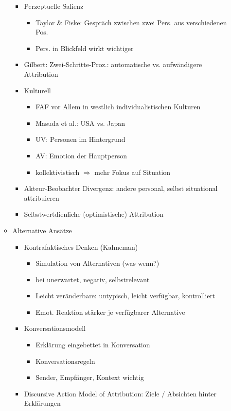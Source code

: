 \documentclass[11pt, paper=a4, twocolumn]{scrartcl}
\begin{document}
\begin{itemize}
\begin{itemize}
\begin{itemize}
\begin{itemize}
								\end{itemize}
							\item Perzeptuelle Salienz
								\begin{itemize}
									\item Taylor \& Fiske: Gespräch zwischen zwei Pers. aus verschiedenen Pos.
									\item Pers. in Blickfeld wirkt wichtiger
								\end{itemize}
							\item Gilbert: Zwei-Schritte-Proz.: automatische vs. aufwändigere Attribution
							\item Kulturell
								\begin{itemize}
									\item FAF vor Allem in westlich individualistischen Kulturen
									\item Masuda et al.: USA vs. Japan
									\item UV: Personen im Hintergrund
									\item AV: Emotion der Hauptperson
									\item kollektivistisch $\Rightarrow$ mehr Fokus auf Situation
								\end{itemize}
							\item Akteur-Beobachter Divergenz: andere personal, selbst situational attribuieren
							\item Selbstwertdienliche (optimistische) Attribution
						\end{itemize}
					\item Alternative Ansätze
						\begin{itemize}
							\item Kontrafaktisches Denken (Kahneman)
								\begin{itemize}
									\item Simulation von Alternativen (was wenn?)
									\item bei unerwartet, negativ, selbstrelevant
									\item Leicht veränderbare: untypisch, leicht verfügbar, kontrolliert
									\item Emot. Reaktion stärker je verfügbarer Alternative
								\end{itemize}
							\item Konversationsmodell
								\begin{itemize}
									\item Erklärung eingebettet in Konversation
									\item Konversationsregeln
									\item Sender, Empfänger, Kontext wichtig
								\end{itemize}
							\item Discursive Action Model of Attribution: Ziele / Absichten hinter Erklärungen
						\end{itemize}
				\end{itemize}
		\end{itemize}
\end{document}
